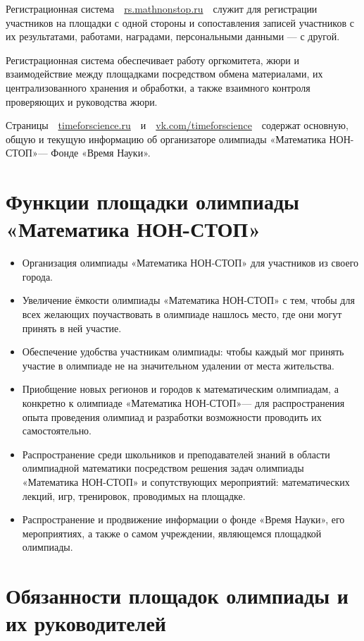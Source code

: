 \documentclass[a4paper,12pt]{article}
\newcommand{\mns}{«Математика НОН-СТОП»\xspace}
\begin{document}
Регистрационная система\ \ \url{rs.mathnonstop.ru}\ \ служит для регистрации участников на площадки с одной стороны и сопоставления записей участников с их результатами, работами, наградами, персональными данными — с другой.

Регистрационная система обеспечивает работу оргкомитета, жюри и взаимодействие между площадками посредством обмена материалами, их централизованного хранения и обработки, а также взаимного контроля проверяющих и руководства жюри.

Страницы\ \ \url{timeforscience.ru}\ \ и\ \ \url{vk.com/timeforscience}\ \ содержат основную, общую и текущую информацию об организаторе олимпиады \mns — Фонде «Время Науки».

\section{Функции площадки олимпиады \mns}

\begin{itemize}
	\item Организация олимпиады \mns для участников из своего города.
	\item Увеличение ёмкости олимпиады \mns с тем, чтобы для всех желающих поучаствовать в олимпиаде нашлось место, где они могут принять в ней участие.
	\item Обеспечение удобства участникам олимпиады: чтобы каждый мог принять участие в олимпиаде не на значительном удалении от места жительства.
	\item Приобщение новых регионов и городов к математическим олимпиадам, а конкретно к олимпиаде \mns — для распространения опыта проведения олимпиад и разработки возможности проводить их самостоятельно.
	\item Распространение среди школьников и преподавателей знаний в области олимпиадной математики посредством решения задач олимпиады \mns и сопутствующих мероприятий: математических лекций, игр, тренировок, проводимых на площадке.
	\item Распространение и продвижение информации о фонде «Время Науки», его мероприятиях, а также о самом учреждении, являющемся площадкой олимпиады.
\end{itemize}

\section{Обязанности площадок олимпиады и их руководителей}
\end{document}

